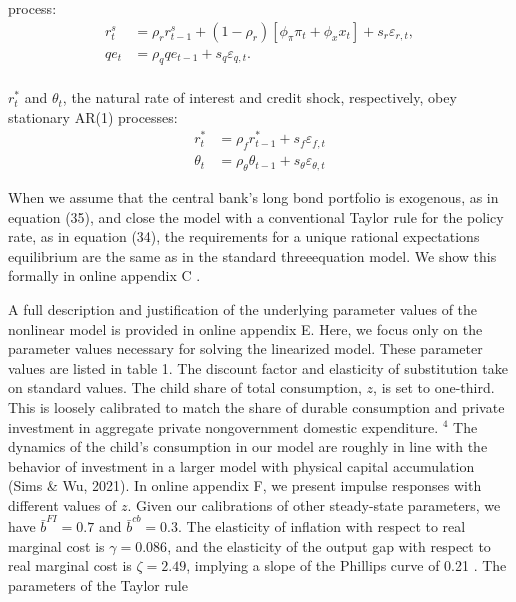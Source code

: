 \documentclass[10pt]{article}
\begin{document}
process:\\
\begin{align*}
r_{t}^{s} & =\rho_{r} r_{t-1}^{s}+\left(1-\rho_{r}\right)\left[\phi_{\pi} \pi_{t}+\phi_{x} x_{t}\right]+s_{r} \varepsilon_{r, t},  \tag{34}\\
q e_{t} & =\rho_{q} q e_{t-1}+s_{q} \varepsilon_{q, t} . \tag{35}
\end{align*}\\
$r_{t}^{*}$ and $\theta_{t}$, the natural rate of interest and credit shock, respectively, obey stationary AR(1) processes:\\
\begin{align*}
r_{t}^{*} & =\rho_{f} r_{t-1}^{*}+s_{f} \varepsilon_{f, t}  \tag{36}\\
\theta_{t} & =\rho_{\theta} \theta_{t-1}+s_{\theta} \varepsilon_{\theta, t} \tag{37}
\end{align*}

When we assume that the central bank's long bond portfolio is exogenous, as in equation (35), and close the model with a conventional Taylor rule for the policy rate, as in equation (34), the requirements for a unique rational expectations equilibrium are the same as in the standard threeequation model. We show this formally in online appendix C .

A full description and justification of the underlying parameter values of the nonlinear model is provided in online appendix E. Here, we focus only on the parameter values necessary for solving the linearized model. These parameter values are listed in table 1. The discount factor and elasticity of substitution take on standard values. The child share of total consumption, $z$, is set to one-third. This is loosely calibrated to match the share of durable consumption and private investment in aggregate private nongovernment domestic expenditure. ${ }^{4}$ The dynamics of the child's consumption in our model are roughly in line with the behavior of investment in a larger model with physical capital accumulation (Sims \& Wu, 2021). In online appendix F, we present impulse responses with different values of $z$. Given our calibrations of other steady-state parameters, we have $\bar{b}^{F I}=0.7$ and $\bar{b}^{c b}=0.3$. The elasticity of inflation with respect to real marginal cost is $\gamma=0.086$, and the elasticity of the output gap with respect to real marginal cost is $\zeta=2.49$, implying a slope of the Phillips curve of 0.21 . The parameters of the Taylor rule
\end{document}
